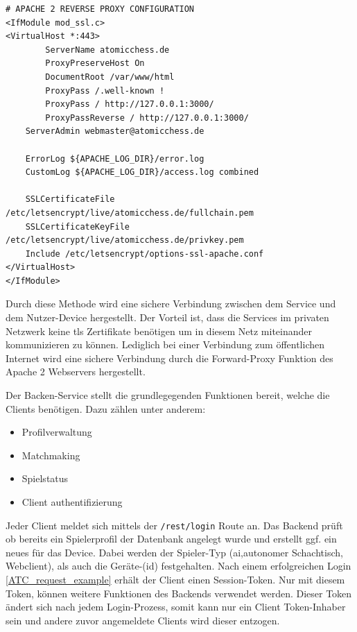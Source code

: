 \begin{lstlisting}
# APACHE 2 REVERSE PROXY CONFIGURATION
<IfModule mod_ssl.c>
<VirtualHost *:443>
        ServerName atomicchess.de
        ProxyPreserveHost On 
        DocumentRoot /var/www/html
        ProxyPass /.well-known !
        ProxyPass / http://127.0.0.1:3000/
        ProxyPassReverse / http://127.0.0.1:3000/   
    ServerAdmin webmaster@atomicchess.de

    ErrorLog ${APACHE_LOG_DIR}/error.log
    CustomLog ${APACHE_LOG_DIR}/access.log combined

    SSLCertificateFile /etc/letsencrypt/live/atomicchess.de/fullchain.pem
    SSLCertificateKeyFile /etc/letsencrypt/live/atomicchess.de/privkey.pem
    Include /etc/letsencrypt/options-ssl-apache.conf
</VirtualHost>
</IfModule>
\end{lstlisting}

Durch diese Methode wird eine sichere Verbindung zwischen dem Service
und dem Nutzer-Device hergestellt. Der Vorteil ist, dass die Services im
privaten Netzwerk keine \gls{tls} Zertifikate benötigen um in diesem
Netz miteinander kommunizieren zu können. Lediglich bei einer Verbindung
zum öffentlichen Internet wird eine sichere Verbindung durch die
Forward-Proxy Funktion des Apache 2 Webservers hergestellt.

Der Backen-Service stellt die grundlegegenden Funktionen bereit, welche
die Clients benötigen. Dazu zählen unter anderem:

\begin{itemize}
\tightlist
\item
  Profilverwaltung
\item
  Matchmaking
\item
  Spielstatus
\item
  Client authentifizierung
\end{itemize}

Jeder Client meldet sich mittels der
\passthrough{\lstinline!/rest/login!} Route an. Das Backend prüft ob
bereits ein Spielerprofil der Datenbank angelegt wurde und erstellt ggf.
ein neues für das Device. Dabei werden der Spieler-Typ
(\gls{ai},autonomer Schachtisch, Webclient), als auch die Geräte-(id)
festgehalten. Nach einem erfolgreichen Login \ref{ATC_request_example}
erhält der Client einen Session-Token. Nur mit diesem Token, können
weitere Funktionen des Backends verwendet werden. Dieser Token ändert
sich nach jedem Login-Prozess, somit kann nur ein Client Token-Inhaber
sein und andere zuvor angemeldete Clients wird dieser entzogen.

